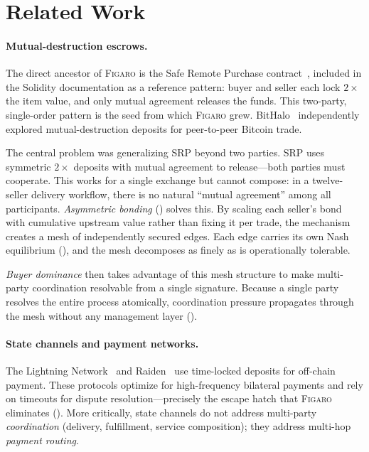 \documentclass[11pt,a4paper]{article}
\theoremstyle{definition}
\theoremstyle{remark}
\newcommand{\figaro}{\textsc{Figaro}}
\begin{document}
\section{Related Work}
\label{sec:related}

\paragraph{Mutual-destruction escrows.}
The direct ancestor of \figaro{} is the Safe Remote Purchase
contract~\citep{solidity2016}, included in the Solidity documentation
as a reference pattern: buyer and seller each lock $2\times$ the item
value, and only mutual agreement releases the funds. This two-party,
single-order pattern is the seed from which \figaro{} grew.
BitHalo~\citep{bithalo2014} independently explored mutual-destruction
deposits for peer-to-peer Bitcoin trade.

The central problem was generalizing SRP beyond two parties. SRP uses
symmetric $2\times$ deposits with mutual agreement to release---both
parties must cooperate. This works for a single exchange but cannot
compose: in a twelve-seller delivery workflow, there is no natural
``mutual agreement'' among all participants. \emph{Asymmetric bonding}
() solves this. By scaling each seller's
bond with cumulative upstream value rather than fixing it per trade,
the mechanism creates a mesh of independently secured edges. Each edge
carries its own Nash equilibrium (), and the
mesh decomposes as finely as is operationally tolerable.

\emph{Buyer dominance} then takes advantage of this mesh structure to
make multi-party coordination resolvable from a single signature.
Because a single party resolves the entire process atomically,
coordination pressure propagates through the mesh without any
management layer ().

\paragraph{State channels and payment networks.}
The Lightning Network~\citep{poon2016} and Raiden~\citep{raiden2017}
use time-locked deposits for off-chain payment. These protocols
optimize for high-frequency bilateral payments and rely on timeouts
for dispute resolution---precisely the escape hatch that \figaro{}
eliminates (). More critically, state
channels do not address multi-party \emph{coordination} (delivery,
fulfillment, service composition); they address multi-hop
\emph{payment routing}.
\end{document}
